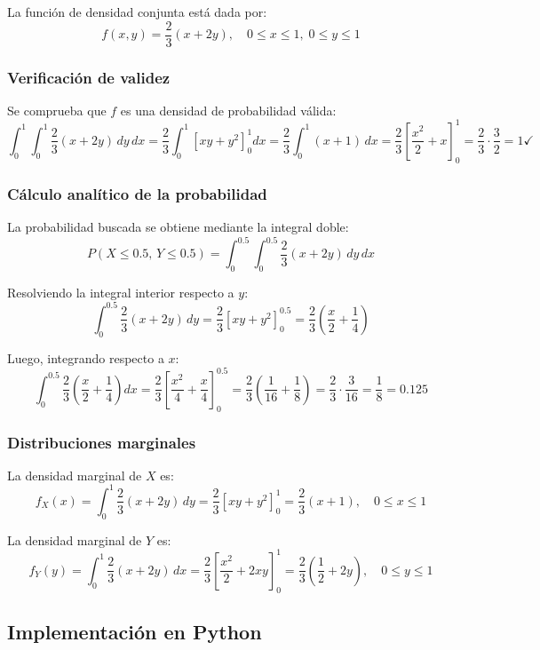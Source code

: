 \documentclass[12pt,a4paper]{article}
\begin{document}
La función de densidad conjunta está dada por:
\[
f(x, y) = \frac{2}{3}(x + 2y), \quad 0 \leq x \leq 1,\; 0 \leq y \leq 1
\]
 
\subsubsection*{Verificación de validez}
 
Se comprueba que $f$ es una densidad de probabilidad válida:
\[
\int_0^1 \int_0^1 \frac{2}{3}(x + 2y)\, dy\, dx 
= \frac{2}{3} \int_0^1 \left[ xy + y^2 \right]_0^1 dx 
= \frac{2}{3} \int_0^1 (x + 1)\, dx 
= \frac{2}{3} \left[\frac{x^2}{2} + x\right]_0^1 
= \frac{2}{3} \cdot \frac{3}{2} = 1 \checkmark
\]
 
\subsubsection*{Cálculo analítico de la probabilidad}
 
La probabilidad buscada se obtiene mediante la integral doble:
\[
P(X \leq 0.5,\, Y \leq 0.5) = \int_{0}^{0.5} \int_{0}^{0.5} \frac{2}{3}(x + 2y)\, dy\, dx
\]
 
Resolviendo la integral interior respecto a $y$:
\[
\int_0^{0.5} \frac{2}{3}(x + 2y)\, dy = \frac{2}{3}\left[xy + y^2\right]_0^{0.5} = \frac{2}{3}\left(\frac{x}{2} + \frac{1}{4}\right)
\]
 
Luego, integrando respecto a $x$:
\[
\int_0^{0.5} \frac{2}{3}\left(\frac{x}{2} + \frac{1}{4}\right) dx = \frac{2}{3}\left[\frac{x^2}{4} + \frac{x}{4}\right]_0^{0.5} = \frac{2}{3}\left(\frac{1}{16} + \frac{1}{8}\right) = \frac{2}{3} \cdot \frac{3}{16} = \frac{1}{8} = 0.125
\]
 
\subsubsection*{Distribuciones marginales}
 
La densidad marginal de $X$ es:
\[
f_X(x) = \int_0^1 \frac{2}{3}(x + 2y)\, dy = \frac{2}{3}\left[xy + y^2\right]_0^1 = \frac{2}{3}(x + 1), \quad 0 \leq x \leq 1
\]
 
La densidad marginal de $Y$ es:
\[
f_Y(y) = \int_0^1 \frac{2}{3}(x + 2y)\, dx = \frac{2}{3}\left[\frac{x^2}{2} + 2xy\right]_0^1 = \frac{2}{3}\left(\frac{1}{2} + 2y\right), \quad 0 \leq y \leq 1
\]
 
\subsection{Implementación en Python}
 
\end{document}
